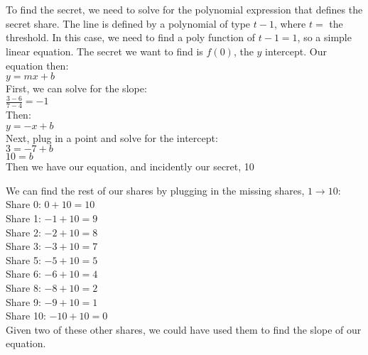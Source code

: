 \documentclass[10pt,letterpaper]{article}
\begin{document}
	\section{}
		To find the secret, we need to solve for the polynomial expression
		that defines the secret share. The line is defined by a
		polynomial of type $t-1$, where $t=$ the threshold. In this
		case, we need to find a poly function of $t-1=1$, so a simple
		linear equation. The secret we want to find is $f(0)$, the
		$y$ intercept. Our equation then:\\

		$y=mx+b$\\

	\noindent First, we can solve for the slope:\\

		$\frac{3-6}{7-4}=-1$\\

	\noindent Then:\\

		$y=-x+b$\\

	\noindent Next, plug in a point and solve for the intercept:\\

		$3=-7+b$\\

		$10=b$\\

	\noindent Then we have our equation, and incidently our secret, 10

	\noindent We can find the rest of our shares by plugging in the missing
	shares, $1 \rightarrow 10$:\\

	Share 0: $0+10=10$\\

	Share 1: $-1+10=9$\\

	Share 2: $-2+10=8$\\

	Share 3: $-3+10=7$\\

	Share 5: $-5+10=5$\\

	Share 6: $-6+10=4$\\

	Share 8: $-8+10=2$\\

	Share 9: $-9+10=1$\\

	Share 10: $-10+10=0$\\

	Given two of these other shares, we could have used them to find the
	slope of our equation. 
\end{document}

